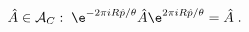 \begin{equation}
\label{NCtrans}
\hat{A}\in{\cal A}_C:\;
\e^{-2\pi i R\hat{p}/\theta}\hat{A}\e^{2\pi i R\hat{p}/\theta}=\hat{A}\;.
\end{equation}

